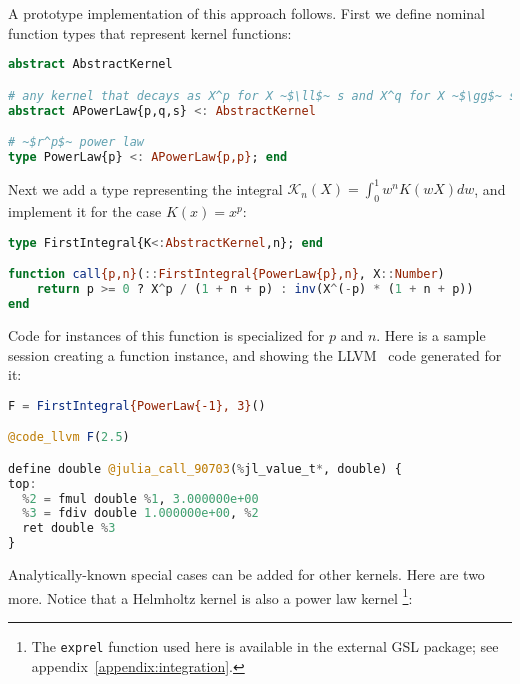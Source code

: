 A prototype implementation of this approach follows.
First we define nominal function types that represent kernel functions:

\begin{singlespace}
\begin{lstlisting}[language=julia]
abstract AbstractKernel

# any kernel that decays as X^p for X ~$\ll$~ s and X^q for X ~$\gg$~ s
abstract APowerLaw{p,q,s} <: AbstractKernel

# ~$r^p$~ power law
type PowerLaw{p} <: APowerLaw{p,p}; end
\end{lstlisting}
\end{singlespace}

\noindent
Next we add a type representing the integral
$\mathcal{K}_n(X) = \int_0^1 w^n K(wX) dw$, and implement it for the
case $K(x) = x^p$:

\begin{singlespace}
\begin{lstlisting}[language=julia]
type FirstIntegral{K<:AbstractKernel,n}; end

function call{p,n}(::FirstIntegral{PowerLaw{p},n}, X::Number)
    return p >= 0 ? X^p / (1 + n + p) : inv(X^(-p) * (1 + n + p))
end
\end{lstlisting}
\end{singlespace}

Code for instances of this function is specialized for $p$ and $n$.
Here is a sample session creating a function instance, and showing the
LLVM~\cite{LLVM} code generated for it:

\begin{singlespace}
\begin{lstlisting}[language=julia]
F = FirstIntegral{PowerLaw{-1}, 3}()

@code_llvm F(2.5)

define double @julia_call_90703(%jl_value_t*, double) {
top:
  %2 = fmul double %1, 3.000000e+00
  %3 = fdiv double 1.000000e+00, %2
  ret double %3
}
\end{lstlisting}
\end{singlespace}

Analytically-known special cases can be added for other kernels.
Here are two more.
Notice that a Helmholtz kernel is also a power law kernel
\footnote{The \texttt{exprel} function used here is available in the
external GSL package; see appendix~\ref{appendix:integration}.}:

